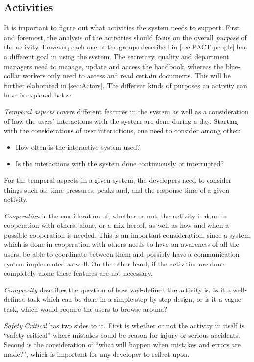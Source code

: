 \subsection{Activities}\label{sec:PACT-actvities}
It is important to figure out what activities the system needs to support.
First and foremost, the analysis of the activities should focus on the overall \textit{purpose} of the activity.
However, each one of the groups described in \cref{sec:PACT-people} has a different goal in using the system.
The secretary,  quality and department managers need to manage, update and access the handbook, whereas the blue-collar workers only need to access and read certain documents.
This will be further elaborated in \cref{sec:Actors}.
The different kinds of purposes an activity can have is explored below.

\textit{Temporal aspects} covers different features in the system as well as a consideration of how the users' interactions with the system are done during a day.
Starting with the considerations of user interactions, one need to consider among other:

\begin{itemize}
	\item How often is the interactive system used?
	\item Is the interactions with the system done continuously or interrupted?
\end{itemize}

For the temporal aspects in a given system, the developers need to consider things such as; time pressures, peaks and, and the response time of a given activity.

\textit{Cooperation} is the consideration of, whether or not, the activity is done in cooperation with others, alone, or a mix hereof, as well as how and when a possible cooperation is needed.
This is an important consideration, since a system which is done in cooperation with others needs to have an awareness of all the users, be able to coordinate between them and possibly have a communication system implemented as well.
On the other hand, if the activities are done completely alone these features are not necessary.

\textit{Complexity} describes the question of how well-defined the activity is.
Is it a well-defined task which can be done in a simple step-by-step design, or is it a vague task, which would require the users to browse around?

\textit{Safety Critical} has two sides to it.
First is whether or not the activity in itself is ``safety-critical'' where mistakes could be reason for injury or serious accidents.
Second is the consideration of ``what will happen when mistakes and errors are made?'', which is important for any developer to reflect upon.

